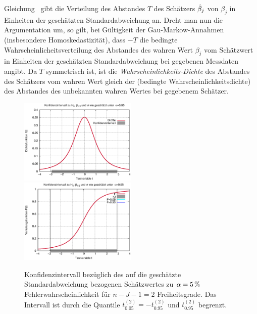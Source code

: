 Gleichung~ gibt die Verteilung des Abstandes $T$ des Sch\"atzers
$\hat{\beta}_j$ von $\beta_j$ in Einheiten der gesch\"atzten
Standardabweichung an. 
Dreht man nun die Argumentation um, so gilt, bei G\"ultigkeit der
Gau\3-Markow-Annahmen (insbesondere Homoskedastizit\"at), dass $-T$
die bedingte Wahrscheinlicheitsverteilung des Abstandes des
wahren Wert $\beta_j$ vom Sch\"atzwert in Einheiten der gesch\"atzten
Standardabweichung bei gegebenen
Messdaten angibt. Da $T$ symmetrisch ist, ist die
\emph{Wahrscheinlichkeits-Dichte} des Abstandes des Sch\"atzers vom
wahren Wert gleich der  (bedingte
Wahrscheinlichkeitsdichte) des Abstandes des
unbekannten wahren Wertes bei gegebenem Sch\"atzer.
\begin{figure}
\includegraphics[width=0.5\textwidth]{figsRegr/f_student_KI.eps}
\includegraphics[width=0.5\textwidth]{figsRegr/F_student_KI.eps}
\caption{\label{fig:student-KI}Konfidenzintervall bez\"uglich des auf
die gesch\"atzte Standardabweichung bezogenen Sch\"atzwertes zu
$\alpha=\unit[5]{\%}$ Fehlerwahrscheinlichkeit f\"ur $n-J-1=2$
Freiheitsgrade. Das Intervall ist durch die Quantile
$t^{(2)}_{0.05}=-t^{(2)}_{0.95}$ 
und $t^{(2)}_{0.95}$ begrenzt.
}
\end{figure}

